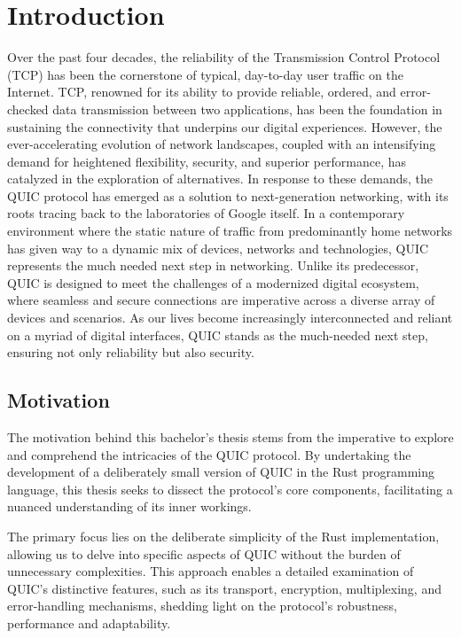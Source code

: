 \chapter{Introduction}

Over the past four decades, the reliability of the Transmission Control Protocol (TCP) has been the cornerstone of typical, day-to-day user traffic on the Internet. TCP, renowned for its ability to provide reliable, ordered, and error-checked data transmission between two applications, has been the foundation in sustaining the connectivity that underpins our digital experiences. However, the ever-accelerating evolution of network landscapes, coupled with an intensifying demand for heightened flexibility, security, and superior performance, has catalyzed in the exploration of alternatives. In response to these demands, the QUIC protocol has emerged as a solution to next-generation networking, with its roots tracing back to the laboratories of Google itself. In a contemporary environment where the static nature of traffic from predominantly home networks has given way to a dynamic mix of devices, networks and technologies, QUIC represents the much needed next step in networking. Unlike its predecessor, QUIC is designed to meet the challenges of a modernized digital ecosystem, where seamless and secure connections are imperative across a diverse array of devices and scenarios. As our lives become increasingly interconnected and reliant on a myriad of digital interfaces, QUIC stands as the much-needed next step, ensuring not only reliability but also security.

\section{Motivation}

The motivation behind this bachelor's thesis stems from the imperative to explore and comprehend the intricacies of the QUIC protocol. By undertaking the development of a deliberately small version of QUIC in the Rust programming language, this thesis seeks to dissect the protocol's core components, facilitating a nuanced understanding of its inner workings. 

The primary focus lies on the deliberate simplicity of the Rust implementation, allowing us to delve into specific aspects of QUIC without the burden of unnecessary complexities. This approach enables a detailed examination of QUIC's distinctive features, such as its transport, encryption, multiplexing, and error-handling mechanisms, shedding light on the protocol's robustness, performance and adaptability.


